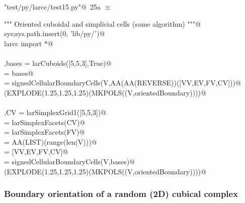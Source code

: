 \documentclass[11pt,oneside]{article}	%
\begin{document}
\begin{flushleft} \small \label{scrap43}
\protect{}\verb@"test/py/larcc/test15.py"@\nobreak\ {\footnotesize 25a }$\equiv$
\vspace{-1ex}
\begin{list}{}{} \item
\mbox{}\verb@""" Oriented cuboidal and simplicial cells (same algorithm) """@\\
\mbox{}\verb@import sys;sys.path.insert(0, 'lib/py/')@\\
\mbox{}\verb@from larcc import *@\\
\mbox{}\verb@@\\
\mbox{}\verb@V,bases = larCuboids([5,5,3],True)@\\
\mbox{}\verb@[VV,EV,FV,CV] = bases@\\
\mbox{}\verb@orientedBoundary = signedCellularBoundaryCells(V,AA(AA(REVERSE))([VV,EV,FV,CV]))@\\
\mbox{}\verb@VIEW(EXPLODE(1.25,1.25,1.25)(MKPOLS((V,orientedBoundary))))@\\
\mbox{}\verb@@\\
\mbox{}\verb@V,CV = larSimplexGrid1([5,5,3])@\\
\mbox{}\verb@FV = larSimplexFacets(CV)@\\
\mbox{}\verb@EV = larSimplexFacets(FV)@\\
\mbox{}\verb@VV = AA(LIST)(range(len(V)))@\\
\mbox{}\verb@bases = [VV,EV,FV,CV]@\\
\mbox{}\verb@orientedBoundary = signedCellularBoundaryCells(V,bases)@\\
\mbox{}\verb@VIEW(EXPLODE(1.25,1.25,1.25)(MKPOLS((V,orientedBoundary))))@\\
\mbox{}\verb@@{\NWsep}
\end{list}
\vspace{-2ex}
\end{flushleft}

\subsubsection{Boundary orientation of a random (2D) cubical complex}
\end{document}
